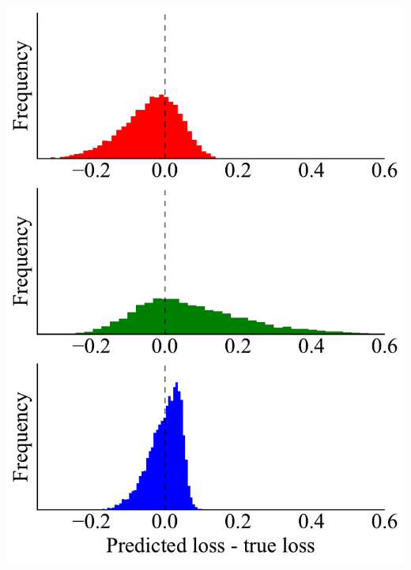 \documentclass[landscape,a0b,final,a4resizeable]{include/a0poster}
\begin{document}
\begin{poster}
\begin{multicols}{3}
\begin{minipage}[c]{36cm}
\begin{center}
  \includegraphics[height=21cm]{figures/learn_vs_true_loss_hist.pdf}
	\caption{
	Comparing three approaches to predicting validation loss.
	\emph{First row:} {\color{red}A Gaussian process}, fit on a small set of hyperparameters and the corresponding validation losses.
	\emph{Second row:} {\color{green}A hypernet, fit on the same small set of hyperparameters} and the corresponding optimized weights.
	\emph{Third row:} Our proposed method, {\color{blue}a hypernet trained with stochastically sampled hyperparameters}.
	\emph{Left:}
	The distribution of predicted and true losses. 
	The diagonal black line is where predicted loss equals true loss. 
	\emph{Right:}
	The distribution of differences between predicted and true losses. 
	The Gaussian process often under-predicts the true loss, while the hypernet trained on the same data tends to over-predict the true loss.
	\label{fig:exp5}
	}
\end{center}
\end{minipage}
\vphantom{A}


\end{multicols}
\end{poster}
\end{document}
